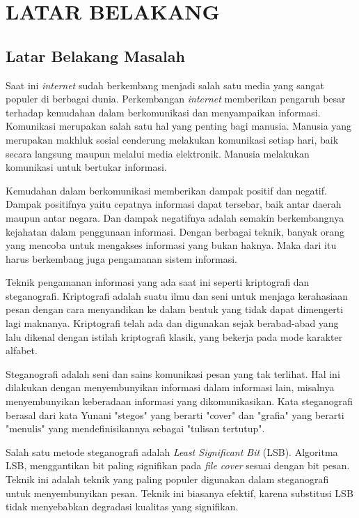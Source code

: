 
\chapter{LATAR BELAKANG}

\section{Latar Belakang Masalah}
Saat ini \emph{internet} sudah berkembang menjadi salah satu media yang sangat populer di berbagai dunia. \cite{bunyamin} Perkembangan \emph{internet} memberikan pengaruh besar terhadap kemudahan dalam berkomunikasi dan menyampaikan informasi. Komunikasi merupakan salah satu hal yang penting bagi manusia. Manusia yang merupakan makhluk sosial cenderung melakukan komunikasi setiap hari, baik secara langsung maupun melalui media elektronik. Manusia melakukan komunikasi untuk bertukar informasi.

Kemudahan dalam berkomunikasi memberikan dampak positif dan negatif. Dampak positifnya yaitu cepatnya informasi dapat tersebar, baik antar daerah maupun antar negara. Dan dampak negatifnya adalah semakin berkembangnya kejahatan dalam penggunaan informasi. Dengan berbagai teknik, banyak orang yang mencoba untuk mengakses informasi yang bukan haknya. Maka dari itu harus berkembang juga pengamanan sistem informasi.

Teknik pengamanan informasi yang ada saat ini seperti kriptografi dan steganografi. Kriptografi adalah suatu ilmu dan seni untuk menjaga kerahasiaan pesan dengan cara menyandikan ke dalam bentuk yang tidak dapat dimengerti lagi maknanya. Kriptografi telah ada dan digunakan sejak berabad-abad yang lalu dikenal dengan istilah kriptografi klasik, yang bekerja pada mode karakter alfabet.

Steganografi adalah seni dan sains komunikasi pesan yang tak terlihat. Hal ini dilakukan dengan menyembunyikan informasi dalam informasi lain, misalnya menyembunyikan keberadaan informasi yang dikomunikasikan. Kata steganografi berasal dari kata Yunani "stegos" yang berarti "cover" dan "grafia" yang berarti "menulis" yang mendefinisikannya sebagai "tulisan tertutup".

Salah satu metode steganografi adalah \emph{Least Significant Bit} (LSB). Algoritma LSB, menggantikan bit paling signifikan pada \emph{file cover} sesuai dengan bit pesan. Teknik ini adalah teknik yang paling populer digunakan dalam steganografi untuk menyembunyikan pesan. Teknik ini biasanya efektif, karena substitusi LSB tidak menyebabkan degradasi kualitas yang signifikan.

